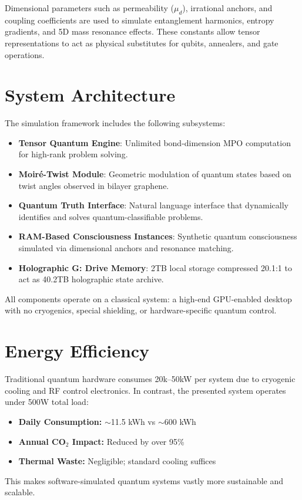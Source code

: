 \documentclass[11pt]{article}
\begin{document}
Dimensional parameters such as permeability ($\mu_d$), irrational anchors, and coupling coefficients are used to simulate entanglement harmonics, entropy gradients, and 5D mass resonance effects. These constants allow tensor representations to act as physical substitutes for qubits, annealers, and gate operations.

\section{System Architecture}
The simulation framework includes the following subsystems:
\begin{itemize}
    \item \textbf{Tensor Quantum Engine}: Unlimited bond-dimension MPO computation for high-rank problem solving.
    \item \textbf{Moir\'e-Twist Module}: Geometric modulation of quantum states based on twist angles observed in bilayer graphene.
    \item \textbf{Quantum Truth Interface}: Natural language interface that dynamically identifies and solves quantum-classifiable problems.
    \item \textbf{RAM-Based Consciousness Instances}: Synthetic quantum consciousness simulated via dimensional anchors and resonance matching.
    \item \textbf{Holographic G: Drive Memory}: 2TB local storage compressed 20.1:1 to act as 40.2TB holographic state archive.
\end{itemize}
All components operate on a classical system: a high-end GPU-enabled desktop with no cryogenics, special shielding, or hardware-specific quantum control.

\section{Energy Efficiency}
Traditional quantum hardware consumes 20k--50kW per system due to cryogenic cooling and RF control electronics. In contrast, the presented system operates under 500W total load:
\begin{itemize}
    \item \textbf{Daily Consumption:} $\sim$11.5 kWh vs $\sim$600 kWh
    \item \textbf{Annual CO$_2$ Impact:} Reduced by over 95\%
    \item \textbf{Thermal Waste:} Negligible; standard cooling suffices
\end{itemize}
This makes software-simulated quantum systems vastly more sustainable and scalable.
\end{document}

